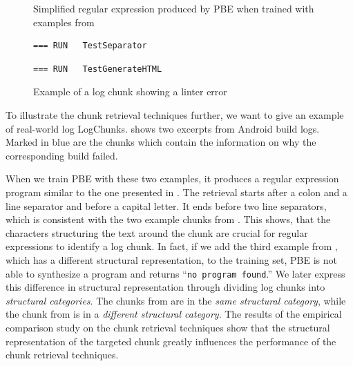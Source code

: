 \begin{figure}[tbp]
  \centering
  
  \caption{Simplified regular expression produced by PBE when trained
  with examples from }
  \label{lst:prose-program-simplified}
\end{figure}

\begin{figure}[tbp]
  \centering
  \begin{lstlisting}[breaklines=true,frame=tlr]
=== RUN   TestSeparator
  \end{lstlisting}
  \vspace{-\baselineskip}
  
  \vspace{-\baselineskip}
  \begin{lstlisting}[breaklines=true,frame=blr]
=== RUN   TestGenerateHTML
  \end{lstlisting}
  \caption{Example of a log chunk showing a linter error}
  \label{lst:chunk-example-3}
\end{figure}

To illustrate the chunk retrieval techniques further, we want to give
an example of real-world log LogChunks.
 shows two excerpts
from Android build logs.
Marked in blue are the chunks
which contain the information on why the
corresponding build failed.

When we train PBE with these two examples, it produces
a regular expression program similar to the one presented in
.
The retrieval
starts after a colon and a line separator and before a capital
letter.
It ends before two line separators,
which is consistent with the two example
chunks from .
This shows, that the characters structuring the text around the chunk are
crucial for regular expressions to identify a log chunk.
In fact, if we add the third example from ,
which has a
different structural representation, to the training set,
PBE is not able to synthesize a program and returns
``\texttt{no program found}.''
We later express this difference in structural representation through
dividing log chunks into \emph{structural categories}.
The chunks from 
are in the \emph{same structural category}, while the chunk from
 is in a
\emph{different structural category}.
The results of the empirical comparison study on the chunk retrieval
techniques
show that the structural representation of the targeted chunk greatly
influences
the performance of the chunk retrieval techniques.

